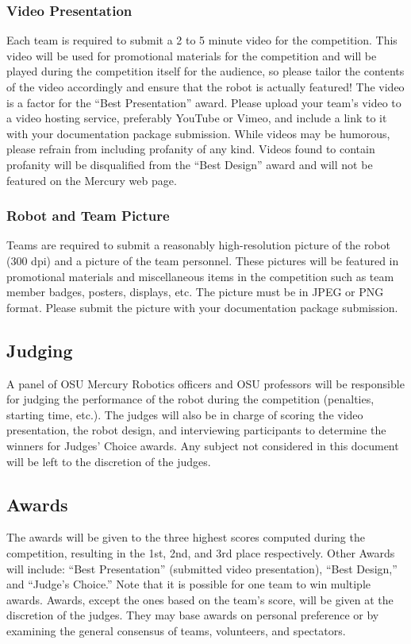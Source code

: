 \subsubsection{Video Presentation}
Each team is required to submit a 2 to 5 minute video for the competition. This video will be used for promotional materials for the competition and will be played during the competition itself for the audience, so please tailor the contents of the video accordingly and ensure that the robot is actually featured! The video is a factor for the “Best Presentation” award. Please upload your team’s video to a video hosting service, preferably YouTube or Vimeo, and include a link to it with your documentation package submission. While videos may be humorous, please refrain from including profanity of any kind. Videos found to contain profanity will be disqualified from the ``Best Design'' award and will not be featured on the Mercury web page.

\subsubsection{Robot and Team Picture}
Teams are required to submit a reasonably high-resolution picture of the robot (300 dpi) and a picture of the team personnel. These pictures will be featured in promotional materials and miscellaneous items in the competition such as team member badges, posters, displays, etc. The picture must be in JPEG or PNG format. Please submit the picture with your documentation package submission.

\subsection{Judging}
A panel of OSU Mercury Robotics officers and OSU professors will be responsible for judging the performance of the robot during the competition (penalties, starting time, etc.). The judges will also be in charge of scoring the video presentation, the robot design, and interviewing participants to determine the winners for Judges’ Choice awards. 
Any subject not considered in this document will be left to the discretion of the judges.

\subsection{Awards}
The awards will be given to the three highest scores computed during the competition, resulting in the 1st, 2nd, and 3rd place respectively. Other Awards will include: “Best Presentation” (submitted video presentation), “Best Design,” and “Judge's Choice.” Note that it is possible for one team to win multiple awards. 
Awards, except the ones based on the team’s score, will be given at the discretion of the judges. They may base awards on personal preference or by examining the general consensus of teams, volunteers, and spectators. 
